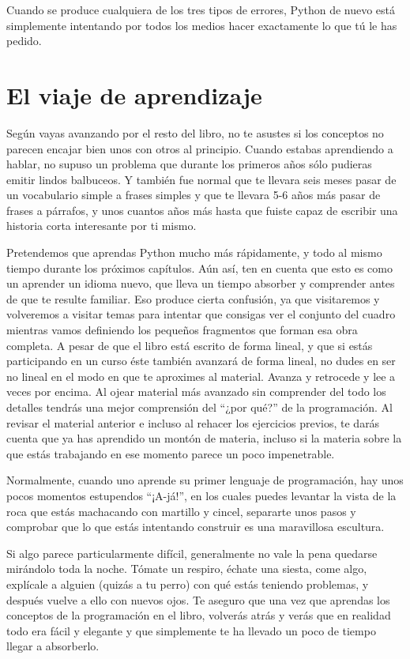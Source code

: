 Cuando se produce cualquiera de los tres tipos de errores, Python de nuevo está
simplemente intentando por todos los medios hacer exactamente lo que tú le has pedido.

\section{El viaje de aprendizaje}

Según vayas avanzando por el resto del libro, no te asustes si los conceptos
no parecen encajar bien unos con otros al principio. Cuando estabas aprendiendo a hablar,
no supuso un problema que durante los primeros años sólo pudieras emitir lindos
balbuceos. Y también fue normal que te llevara seis meses pasar de un vocabulario simple
a frases simples y que te llevara 5-6 años más pasar de frases a párrafos, y unos cuantos
años más hasta que fuiste capaz de escribir una historia corta interesante por ti mismo.

Pretendemos que aprendas Python mucho más rápidamente, y todo al mismo tiempo
durante los próximos capítulos.
Aún así, ten en cuenta que esto es como un aprender un idioma nuevo, que lleva un tiempo
absorber y comprender antes de que te resulte familiar.
Eso produce cierta confusión, ya que visitaremos y volveremos a visitar
temas para intentar que consigas ver el conjunto del cuadro mientras vamos definiendo
los pequeños fragmentos que forman esa obra completa. A pesar de que el libro está
escrito de forma lineal, y que si estás participando en un curso éste también avanzará
de forma lineal, no dudes en ser no lineal en el modo en que te aproximes al material.
Avanza y retrocede y lee a veces por encima. Al ojear material más avanzado sin comprender del
todo los detalles tendrás una mejor comprensión del ``¿por qué?'' de la programación.
Al revisar el material anterior e incluso al rehacer los ejercicios previos,
te darás cuenta que ya has aprendido un montón de materia, incluso si la materia
sobre la que estás trabajando en ese momento parece un poco impenetrable.

Normalmente, cuando uno aprende su primer lenguaje de programación, hay unos pocos
momentos estupendos ``¡A-já!'', en los cuales puedes levantar la vista de la roca que
estás machacando con martillo y cincel, separarte unos pasos y comprobar
que lo que estás intentando construir es una maravillosa escultura.

Si algo parece particularmente difícil, generalmente no vale la pena quedarse mirándolo
toda la noche. Tómate un respiro, échate una siesta, come algo, explícale a alguien
(quizás a tu perro) con qué estás teniendo problemas, y después vuelve a ello con nuevos
ojos. Te aseguro que una vez que aprendas los conceptos de la programación en
el libro, volverás atrás y verás que en realidad todo era fácil y elegante y que
simplemente te ha llevado un poco de tiempo llegar a absorberlo.


